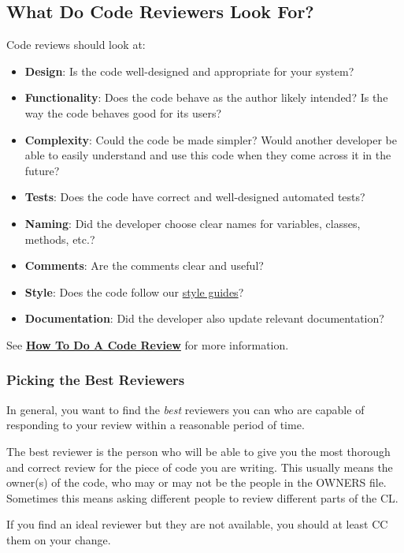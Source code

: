 \documentclass[
]{article}
\providecommand{\tightlist}{%
  \setlength{\itemsep}{0pt}\setlength{\parskip}{0pt}}
\begin{document}
\subsection{What Do Code Reviewers Look For?}\label{look_for}

Code reviews should look at:

\begin{itemize}
\tightlist
\item
  \textbf{Design}: Is the code well-designed and appropriate for your
  system?
\item
  \textbf{Functionality}: Does the code behave as the author likely
  intended? Is the way the code behaves good for its users?
\item
  \textbf{Complexity}: Could the code be made simpler? Would another
  developer be able to easily understand and use this code when they
  come across it in the future?
\item
  \textbf{Tests}: Does the code have correct and well-designed automated
  tests?
\item
  \textbf{Naming}: Did the developer choose clear names for variables,
  classes, methods, etc.?
\item
  \textbf{Comments}: Are the comments clear and useful?
\item
  \textbf{Style}: Does the code follow our
  \href{http://google.github.io/styleguide/}{style guides}?
\item
  \textbf{Documentation}: Did the developer also update relevant
  documentation?
\end{itemize}

See \textbf{\href{reviewer/index.md}{How To Do A Code Review}} for more
information.

\subsubsection{Picking the Best Reviewers}\label{best_reviewers}

In general, you want to find the \emph{best} reviewers you can who are
capable of responding to your review within a reasonable period of time.

The best reviewer is the person who will be able to give you the most
thorough and correct review for the piece of code you are writing. This
usually means the owner(s) of the code, who may or may not be the people
in the OWNERS file. Sometimes this means asking different people to
review different parts of the CL.

If you find an ideal reviewer but they are not available, you should at
least CC them on your change.
\end{document}
